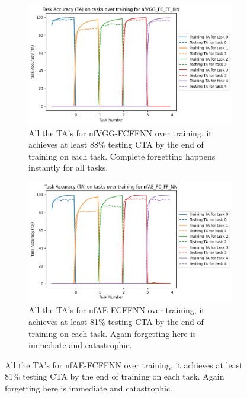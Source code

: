 \begin{figure}[ht]
    \begin{subfigure}[t]{0.4\textwidth}
      \includegraphics[width=\linewidth]{images/CIFAR10_CL/nfVGG_FC_FF_NN_TA_task.png}
      \caption{All the TA's for nfVGG-FCFFNN over training, it achieves at least 88\% testing CTA by the end of training on each task. Complete forgetting happens instantly for all tasks.}
   \end{subfigure}
   \quad %
   \begin{subfigure}[t]{0.4\textwidth}
      \includegraphics[width=\linewidth]{images/CIFAR10_CL/nfAE_FC_FF_NN_TA_task.png}
      \caption{All the TA's for nfAE-FCFFNN over training, it achieves at least 81\% testing CTA by the end of training on each task. Again forgetting here is immediate and catastrophic.}
   \end{subfigure}

    \medskip %


\end{figure}
